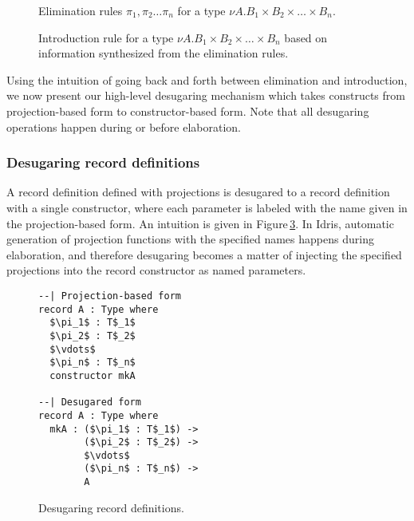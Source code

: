 \begin{figure}
\caption{Elimination rules $\pi_1, \pi_2 \ldots \pi_n$ for a type $\nu A. B_1 \times B_2 \times \ldots \times B_n$.}
\label{fig:nuA_elim_rules}
\end{figure}

\begin{figure}
\caption{Introduction rule for a type $\nu A. B_1 \times B_2 \times \ldots \times B_n$ based on information synthesized from the elimination rules.}
\label{fig:nuA_intro_rule}
\end{figure}

Using the intuition of going back and forth between elimination and introduction, we now present our high-level desugaring mechanism which takes constructs from projection-based form to constructor-based form. Note that all desugaring operations happen during or before elaboration.



\subsubsection{Desugaring record definitions}

A record definition defined with projections is desugared to a record definition with a single constructor, where each parameter is labeled with the name given in the projection-based form. An intuition is given in Figure\,\ref{fig:desugar_records}. In Idris, automatic generation of projection functions with the specified names happens during elaboration, and therefore desugaring becomes a matter of injecting the specified projections into the record constructor as named parameters.

\begin{figure}
\begin{lstlisting}[mathescape]
--| Projection-based form
record A : Type where
  $\pi_1$ : T$_1$
  $\pi_2$ : T$_2$
  $\vdots$
  $\pi_n$ : T$_n$
  constructor mkA

--| Desugared form
record A : Type where
  mkA : ($\pi_1$ : T$_1$) ->
        ($\pi_2$ : T$_2$) ->
        $\vdots$
        ($\pi_n$ : T$_n$) ->
        A
\end{lstlisting}
\caption{Desugaring record definitions.}
\label{fig:desugar_records}
\end{figure}

